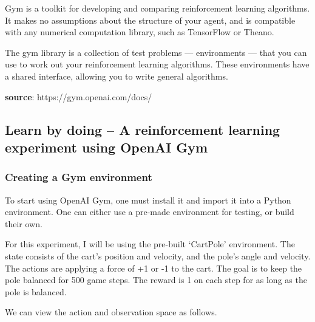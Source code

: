 \documentclass[11pt]{article}
\begin{document}
Gym is a toolkit for developing and comparing reinforcement learning
algorithms. It makes no assumptions about the structure of your agent,
and is compatible with any numerical computation library, such as
TensorFlow or Theano.

The gym library is a collection of test problems --- environments ---
that you can use to work out your reinforcement learning algorithms.
These environments have a shared interface, allowing you to write
general algorithms.

\textbf{source}: https://gym.openai.com/docs/

    \hypertarget{learn-by-doing-a-reinforcement-learning-experiment-using-openai-gym}{%
\subsection{Learn by doing -- A reinforcement learning experiment using
OpenAI
Gym}\label{learn-by-doing-a-reinforcement-learning-experiment-using-openai-gym}}

    \hypertarget{creating-a-gym-environment}{%
\subsubsection{Creating a Gym
environment}\label{creating-a-gym-environment}}

To start using OpenAI Gym, one must install it and import it into a
Python environment. One can either use a pre-made environment for
testing, or build their own.

For this experiment, I will be using the pre-built `CartPole'
environment. The state consists of the cart's position and velocity, and
the pole's angle and velocity. The actions are applying a force of +1 or
-1 to the cart. The goal is to keep the pole balanced for 500 game
steps. The reward is 1 on each step for as long as the pole is balanced.

We can view the action and observation space as follows.
\end{document}
